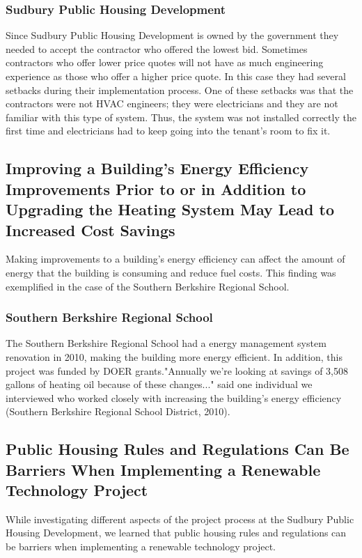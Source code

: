 \subsubsection{Sudbury Public Housing Development}
\par Since Sudbury Public Housing  Development is owned by the government they needed to accept the contractor who offered the lowest bid. Sometimes contractors who offer lower price quotes will not have as much engineering experience as those who offer a higher price quote. In this case they had several setbacks during their implementation process. One of these setbacks was that the contractors were not HVAC engineers; they were electricians and they are not familiar with this type of system. Thus, the system was not installed correctly the first time and electricians had to keep going into the tenant's room to fix it.

\subsection{Improving a Building’s Energy Efficiency Improvements Prior to or in Addition to Upgrading the Heating System May Lead to Increased Cost Savings}
\par Making improvements to a building’s energy efficiency can affect the amount of energy that the building is consuming and reduce fuel costs. This finding was exemplified in the case of the Southern Berkshire Regional School.

\subsubsection{Southern Berkshire Regional School}
\par The Southern Berkshire Regional School had a energy management system renovation in 2010, making the building more energy efficient. In addition, this project was funded by DOER grants."Annually we’re looking at savings of 3,508 gallons of heating oil because of these changes..." said one individual we interviewed who worked closely with increasing the building’s energy efficiency (Southern Berkshire Regional School District, 2010).

\subsection{Public Housing Rules and Regulations Can Be Barriers When Implementing a Renewable Technology Project}
\par While investigating different aspects of the project process at the Sudbury Public Housing Development, we learned that public housing rules and regulations can be barriers when implementing a renewable technology project. 
